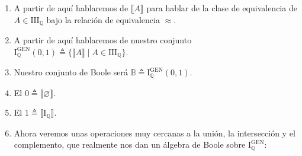 \begin{enumerate}
\begin{enumerate}
\begin{enumerate}
        \begin{itemize}
        \tightlist
        \item
          $\#(A \symdiff B) = n_{1} \in \mathbb{N} \land \#(B \symdiff C) = n_{2} \in \mathbb{N} \Rightarrow \#(A \symdiff C) \leq n_{1} + n_{2} \in \mathbb{N}.$
          Y queda demostrada la propiedad transitiva.
        \end{itemize}
      \end{enumerate}
    \item
      A partir de aquí hablaremos de $⟦A⟧$ para hablar de la clase de
      equivalencia de $A \in \mathbf{\mathrm{III}}_{\mathbb{Q}}$ bajo
      la relación de equivalencia $\approx.$
    \item
      A partir de aquí hablaremos de nuestro conjunto
      $\mathbf{\mathrm{I}}_{\mathbb{Q}}^{\mathbf{\mathrm{GEN}}}(0,1) \triangleq \{ ⟦A⟧ \mid A \in \mathbf{\mathrm{III}}_{\mathbb{Q}} \}.$
    \item
      Nuestro conjunto de Boole será
      $\mathbb{B} \triangleq \mathbf{\mathrm{I}}_{\mathbb{Q}}^{\mathbf{\mathrm{GEN}}}(0,1).$
    \item
      El $0 \triangleq ⟦\varnothing⟧.$
    \item
      El $1 \triangleq ⟦\mathbf{\mathrm{I}}_{\mathbb{Q}}⟧.$
    \item
      Ahora veremos unas operaciones muy cercanas a la unión, la
      intersección y el complemento, que realmente nos dan un álgebra
      de Boole sobre
      $\mathbf{\mathrm{I}}_{\mathbb{Q}}^{\mathbf{\mathrm{GEN}}}:$


\end{enumerate}
\end{enumerate}
